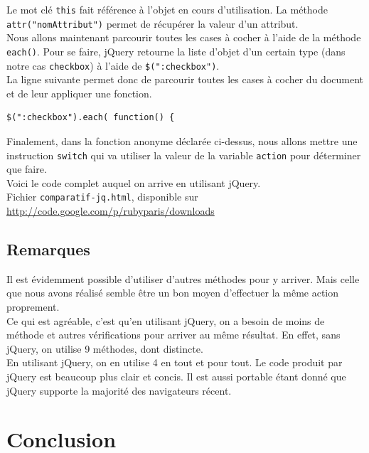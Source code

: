 \documentclass[10pt,a4paper,titlepage]{article}
\begin{document}
Le mot clé \texttt{this} fait référence à l'objet en cours d'utilisation. La méthode \texttt{attr("nomAttribut")} permet de récupérer la valeur d'un attribut. \\

Nous allons maintenant parcourir toutes les cases à cocher à l'aide de la méthode \texttt{each()}. Pour se faire, jQuery retourne la liste d'objet d'un certain type (dans notre cas \texttt{checkbox}) à l'aide de \verb!$(":checkbox")!.  \\ 

La ligne suivante permet donc de parcourir toutes les cases à cocher du document et de leur appliquer une fonction.

\begin{lstlisting}
$(":checkbox").each( function() {
\end{lstlisting}

Finalement, dans la fonction anonyme déclarée ci-dessus, nous allons mettre une instruction \texttt{switch} qui va utiliser la valeur de la variable \texttt{action} pour déterminer que faire.  \\

Voici le code complet auquel on arrive en utilisant jQuery. \\

Fichier \texttt{comparatif-jq.html}, disponible sur \url{http://code.google.com/p/rubyparis/downloads}



\subsection{Remarques}

Il est évidemment possible d'utiliser d'autres méthodes pour y arriver. Mais celle que nous avons réalisé semble être un bon moyen d'effectuer la même action proprement.  \\

Ce qui est agréable, c'est qu'en utilisant jQuery, on a besoin de moins de méthode et autres vérifications pour arriver au même résultat. En effet, sans jQuery, on utilise 9 méthodes, dont distincte. \\

En utilisant jQuery, on en utilise 4 en tout et pour tout. Le code produit par jQuery est beaucoup plus clair et concis. Il est aussi portable étant donné que jQuery supporte la majorité des navigateurs récent.

\newpage
\section{Conclusion}





% 
% 
% 
% 
\end{document}
